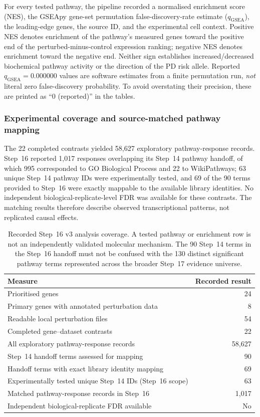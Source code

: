\documentclass[11pt,a4paper]{article}
\begin{document}
For every tested pathway, the pipeline recorded a normalised enrichment score (NES), the GSEApy gene-set permutation false-discovery-rate estimate ($q_{\mathrm{GSEA}}$), the leading-edge genes, the source ID, and the experimental cell context. Positive NES denotes enrichment of the pathway's measured genes toward the positive end of the perturbed-minus-control expression ranking; negative NES denotes enrichment toward the negative end. Neither sign establishes increased/decreased biochemical pathway activity or the direction of the PD risk allele. Reported $q_{\mathrm{GSEA}}=0.000000$ values are software estimates from a finite permutation run, \emph{not} literal zero false-discovery probability. To avoid overstating their precision, these are printed as ``0 (reported)'' in the tables.

\subsubsection{Experimental coverage and source-matched pathway mapping}
\label{subsec:step16_coverage}
The 22 completed contrasts yielded 58,627 exploratory pathway-response records. Step~16 reported 1,017 responses overlapping its Step~14 pathway handoff, of which 995 corresponded to GO Biological Process and 22 to WikiPathways; 63 unique Step~14 pathway IDs were experimentally tested, and 69 of the 90 terms provided to Step~16 were exactly mappable to the available library identities. No independent biological-replicate-level FDR was available for these contrasts. The matching results therefore describe observed transcriptional patterns, not replicated causal effects.

\begin{table}[!htbp]
\centering\small
\caption{Recorded Step~16 v3 analysis coverage. A tested pathway or enrichment row is not an independently validated molecular mechanism. The 90 Step~14 terms in the Step~16 handoff must not be confused with the 130 distinct significant pathway terms represented across the broader Step~17 evidence universe.}
\label{tab:step16_inventory}
\begin{tabular}{@{}lr@{}}
\toprule
Measure & Recorded result \\
\midrule
Prioritised genes & 24 \\
Primary genes with annotated perturbation data & 8 \\
Readable local perturbation files & 54 \\
Completed gene--dataset contrasts & 22 \\
All exploratory pathway-response records & 58,627 \\
Step~14 handoff terms assessed for mapping & 90 \\
Handoff terms with exact library identity mapping & 69 \\
Experimentally tested unique Step~14 IDs (Step~16 scope) & 63 \\
Matched pathway-response records in Step~16 & 1,017 \\
Independent biological-replicate FDR available & No \\
\bottomrule
\end{tabular}
\end{table}
\end{document}

